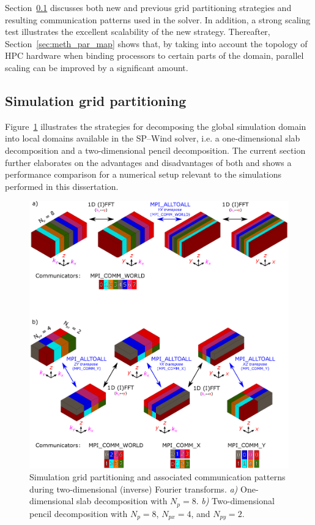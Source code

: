 Section~\ref{sec:meth_par_part} discusses both new and previous grid partitioning strategies and resulting communication patterns used in the solver. In addition, a strong scaling test illustrates the excellent scalability of the new strategy. Thereafter, Section~\ref{sec:meth_par_map} shows that, by taking into account the topology of HPC hardware when binding processors to certain parts of the domain, parallel scaling can be improved by a significant amount.

\subsection{Simulation grid partitioning}\label{sec:meth_par_part}
Figure~\ref{fig:grid_partitioning} illustrates the strategies for decomposing the global simulation domain into local domains available in the SP--Wind solver, i.e. a one-dimensional slab decomposition and a two-dimensional pencil decomposition. The current section further elaborates on the advantages and disadvantages of both and shows a performance comparison for a numerical setup relevant to the simulations performed in this dissertation. 

\begin{figure}
	\includegraphics[width=\textwidth]{figures/meth_slab_pencil.eps}
	\caption[Simulation grid partitioning and associated communication patterns during two-dimensional (inverse) Fourier transforms.]{Simulation grid partitioning and associated communication patterns during two-dimensional (inverse) Fourier transforms. \emph{a)} One-dimensional slab decomposition with $N_p = 8$. \emph{b)} Two-dimensional pencil decomposition with $N_p = 8$, $N_{px} = 4$, and $N_{py} = 2$. \label{fig:grid_partitioning}}
\end{figure}

